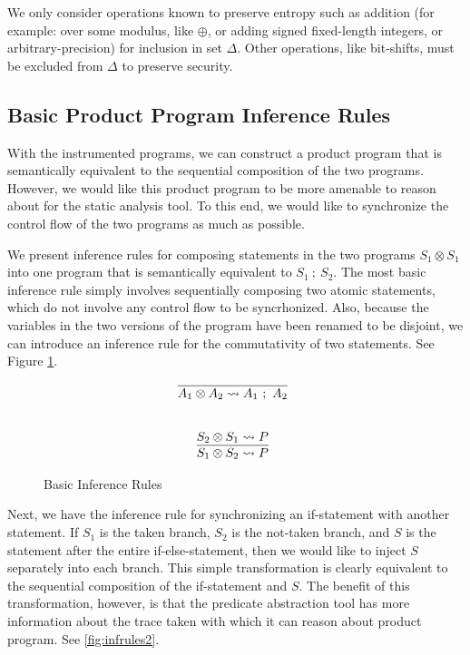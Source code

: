 \documentclass[letterpaper,twocolumn,10pt]{article}
\newcommand{\cross}{\otimes{}}
\begin{document}
We only consider operations known to preserve entropy such as addition (for example: over some modulus, like $\oplus$, or adding signed fixed-length integers, or arbitrary-precision) for inclusion in set $\Delta$.
Other operations, like bit-shifts, must be excluded from $\Delta$ to preserve security.

\subsection{Basic Product Program Inference Rules}
\label{sec:basicpprules}

With the instrumented programs, we can construct a product program that is semantically equivalent to the sequential composition of the two programs. However, we would like this product program to be more amenable to reason about for the static analysis tool. To this end, we would like to synchronize the control flow of the two programs as much as possible. 

We present inference rules for composing statements in the two programs $S_1 \cross S_1$ into one program that is semantically equivalent to $S_1\ ;\ S_2$. The most basic inference rule simply involves sequentially composing two atomic statements, which do not involve any control flow to be syncrhonized. Also, because the variables in the two versions of the program have been renamed to be disjoint, we can introduce an inference rule for the commutativity of two statements. See Figure \ref{fig:infrules1}.

\begin{figure}
    \caption{Basic Inference Rules}
    \label{fig:infrules1}
    \[
		\begin{array}{c}
			\infer[]{A_1 \cross A_2 \leadsto A_1\ ;\ A_2}{} \\ \\ \\
			\infer[]{S_1 \cross S_2 \leadsto P}{
				S_2 \cross S_1 \leadsto P
			}
        \end{array}
    \]
\end{figure}

Next, we have the inference rule for synchronizing an if-statement with another statement. If $S_1$ is the taken branch, $S_2$ is the not-taken branch, and $S$ is the statement after the entire if-else-statement, then we would like to inject $S$ separately into each branch. This simple transformation is clearly equivalent to the sequential composition of the if-statement and $S$. The benefit of this transformation, however, is that the predicate abstraction tool has more information about the trace taken with which it can reason about product program. See \ref{fig:infrules2}.
\end{document}
